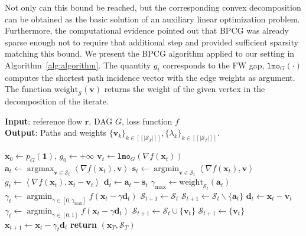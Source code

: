 \documentclass{ecai}
\DeclareMathOperator*{\argmax}{argmax}
\DeclareMathOperator*{\argmin}{argmin}
\newcommand{\innp}[2]{\left\langle #1, #2 \right\rangle}
\newcommand{\vx}{\mathbf{x}}
\newcommand{\vvv}{\mathbf{v}}
\newcommand{\vd}{\mathbf{d}}
\newcommand{\vr}{\mathbf{r}}
\newcommand{\va}{\mathbf{a}}
\newcommand{\vs}{\mathbf{s}}
\newcommand{\Scal}{{\ensuremath{\mathcal{S}}}}
\newcommand{\interval}[1]{ [\![  #1 ]\!]}
\begin{document}
Not only can this bound be reached, but the corresponding convex decomposition can be obtained as the basic solution of an auxiliary linear optimization problem.
Furthermore, the computational evidence pointed out that BPCG was already sparse enough not to require that additional step and provided sufficient sparsity matching this bound.
We present the BPCG algorithm applied to our setting in Algorithm~\ref{alg:algorithm}.
The quantity $g_t$ corresponds to the FW gap, $\texttt{lmo}_G(\cdot)$ computes the shortest path incidence vector with the edge weights as argument.
The function $\mathrm{weight}_{\mathcal{S}}(\vvv)$ returns the weight of the given vertex in the decomposition of the iterate.
\begin{algorithm}[tb]
    \caption{Blended pairwise conditional gradient for flow decomposition}
    \label{alg:algorithm}
    \textbf{Input}: reference flow $\vr$, DAG $G$, loss function $f$\\
    \textbf{Output}: Paths and weights $\{\vvv_k\}_{k \in \interval{|\Scal_T|}}, \{\lambda_k\}_{k \in \interval{|\Scal_T|}}$.
    \vspace*{-0.3cm}
    \begin{algorithmic}[1] %
        \STATE $\vx_0 \gets p_G(\mathbf{1})$, $g_0 \gets +\infty$
        \FOR{$t \in \interval{T}$ }
        \STATE $\vvv_t \gets \texttt{lmo}_G(\nabla f(\vx_t))$
        \STATE $\va_t \gets \argmax_{\vvv \in \Scal_t} \innp{\nabla f(\vx_t)}{\vvv}$\label{line:search1}
        \STATE $\vs_t  \gets \argmin_{\vvv \in \Scal_t} \innp{\nabla f(\vx_t)}{\vvv}$\label{line:search2}
        \STATE $g_t  \gets \innp{\nabla f(\vx_t)}{\vx_t - \vvv_t}$        
        \IF { $\innp{\nabla f(\vx_t)}{\va_t - \vs_t} \geq g_t$ } %
        \STATE $\vd_t \gets \va_t - \vs_t$
        \STATE $\gamma_{\max} \gets \mathrm{weight}_{\Scal_t}(\va_t)$
        \STATE $\gamma_t \gets \argmin_{\gamma \in [0,\gamma_{\max}]} f(\vx_t - \gamma \vd_t)$
            \STATE $\Scal_{t+1} \gets \Scal_{t}$
        \ELSE
            \STATE $\Scal_{t+1} \gets \Scal_{t} \backslash \{\va_t\}$
        \ENDIF
        \ELSE
        \STATE $\vd_t \gets \vx_t - \vvv_t$
        \STATE $\gamma_t \gets \argmin_{\gamma \in [0,1]} f(\vx_t - \gamma \vd_t)$
            \STATE $\Scal_{t+1} \gets \Scal_{t} \cup \{\vvv_t\}$
        \ELSE
            \STATE $\Scal_{t+1} \gets \{\vvv_t\}$
        \ENDIF
        \ENDIF
        \STATE $\vx_{t+1} \gets \vx_t - \gamma_t \vd_t$
        \ENDFOR
        \STATE \textbf{return} $(\vx_T, \Scal_T)$
    \end{algorithmic}
\end{algorithm}
\end{document}
